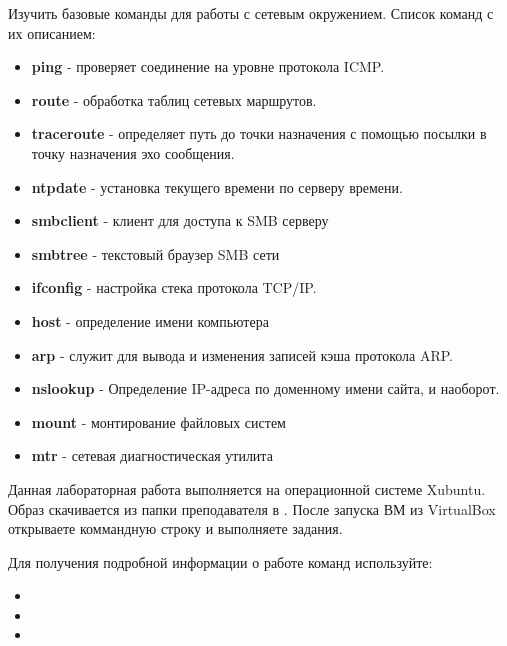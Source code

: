 \documentclass[a4paper,12pt]{article}
\begin{document}

  \begin{flushleft}
    Изучить базовые команды для работы с сетевым окружением.
    Список команд с их описанием:
    \begin{itemize}
     \item {\bf ping} - проверяет соединение на уровне протокола ICMP.
     \item {\bf route} - обработка таблиц сетевых маршрутов.
     \item {\bf traceroute} - определяет путь до точки назначения с помощью посылки в точку назначения эхо сообщения.
     \item {\bf ntpdate} - установка текущего времени по серверу времени.
     \item {\bf smbclient} - клиент для доступа к SMB серверу
     \item {\bf smbtree} - текстовый браузер SMB сети
     \item {\bf ifconfig} - настройка стека протокола TCP/IP.
     \item {\bf host} - определение имени компьютера
     \item {\bf arp} - служит для вывода и изменения записей кэша протокола ARP.
     \item {\bf nslookup} - Определение IP-адреса по доменному имени сайта, и наоборот.
     \item {\bf mount} - монтирование файловых систем
     \item {\bf mtr} - сетевая диагностическая утилита
    \end{itemize}
  \end{flushleft}


  \begin{flushleft}
    Данная лабораторная работа выполняется на операционной системе Xubuntu. Образ скачивается из папки преподавателя в . После запуска ВМ из VirtualBox открываете коммандную строку и выполняете задания.
  \end{flushleft}

  \begin{flushleft}
   Для получения подробной информации о работе команд используйте:
   \begin{itemize}
    \item {}
    \item {}
    \item {}
   \end{itemize}
  \end{flushleft}
\end{document}
